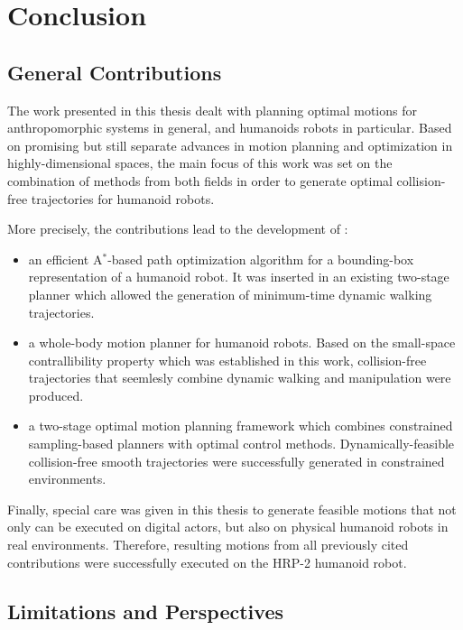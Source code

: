 \chapter{Conclusion}
\label{chap:conclusion}

\section{General Contributions}

The work presented in this thesis dealt with planning optimal motions
for anthropomorphic systems in general, and humanoids robots in
particular. Based on promising but still separate advances in
motion planning and optimization in highly-dimensional spaces, the
main focus of this work was set on the combination of methods from
both fields in order to generate optimal collision-free trajectories
for humanoid robots. 

More precisely, the contributions lead to the development of :
\begin{itemize}
\item an efficient A$^*$-based path optimization algorithm for a
  bounding-box representation of a humanoid robot. It was inserted in
  an existing two-stage planner which allowed the generation of
  minimum-time dynamic walking trajectories.
\item a whole-body motion planner for humanoid robots. Based on the
  small-space contrallibility property which was established in this
  work, collision-free trajectories that seemlesly combine dynamic
  walking and manipulation were produced.
\item a two-stage optimal motion planning framework which combines
  constrained sampling-based planners with optimal control
  methods. Dynamically-feasible collision-free smooth trajectories
  were successfully generated in constrained environments.
\end{itemize}

Finally, special care was given in this thesis to generate feasible
motions that not only can be executed on digital actors, but also on
physical humanoid robots in real environments. Therefore, resulting
motions from all previously cited contributions were successfully
executed on the HRP-2 humanoid robot.

\section{Limitations and Perspectives}

